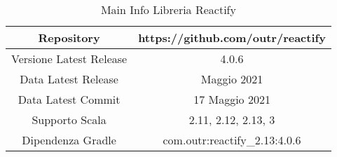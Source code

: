 \documentclass[../main.tex]{subfiles}
\begin{document}
\begin{table}[H]
\centering
\begin{tabular}{|c|c|}
     \hline
     Repository & https://github.com/outr/reactify \\
     \hline
     Versione Latest Release & 4.0.6 \\
     \hline
     Data Latest Release & Maggio 2021 \\
     \hline
     Data Latest Commit & 17 Maggio 2021 \\
     \hline
     Supporto Scala & 2.11, 2.12, 2.13, 3 \\
     \hline
     Dipendenza Gradle & com.outr:reactify\_2.13:4.0.6 \\
     \hline
\end{tabular}
\caption{Main Info Libreria Reactify}
\end{table}
\end{document}
